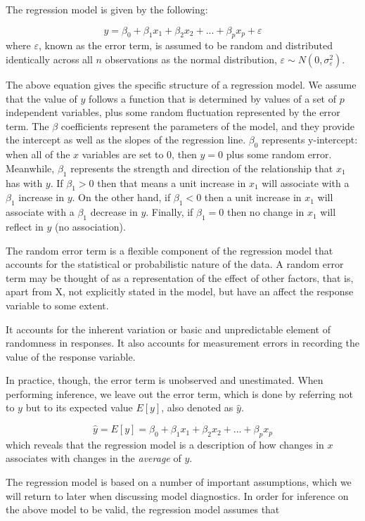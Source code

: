 \documentclass{article}
\begin{document}
The regression model is given by the following:

$$
y = \beta_0 + \beta_1 x_1 + \beta_2 x_2 + ... + \beta_p x_p + \varepsilon
$$
where $\varepsilon$, known as the error term, is assumed to be random and distributed identically across all $n$ observations as the normal distribution, $\varepsilon \sim N(0, \sigma^2_\varepsilon)$.

The above equation gives the specific structure of a regression model. We assume that the value of $y$ follows a function that is determined by values of a set of $p$ independent variables, plus some random fluctuation represented by the error term. The $\beta$ coefficients represent the parameters of the model, and they provide the intercept as well as the slopes of the regression line. $\beta_0$ represents y-intercept: when all of the $x$ variables are set to 0, then $y = 0$ plus some random error. Meanwhile, $\beta_1$ represents the strength and direction of the relationship that $x_1$ has with $y$. If $\beta_1 > 0$ then that means a unit increase in $x_1$ will associate with a $\beta_1$ increase in $y$. On the other hand, if $\beta_1 < 0$ then a unit increase in $x_1$ will associate with a $\beta_1$ decrease in $y$. Finally, if $\beta_1 = 0$ then no change in $x_1$ will reflect in $y$ (no association).

The random error term is a flexible component of the regression model that accounts for the statistical or probabilistic nature of the data. A random error term may be thought of as a representation of the effect of other factors, that is, apart from X, not explicitly stated in the model, but have an affect the response variable to some extent.

It accounts for the inherent variation or basic and unpredictable element of randomness in responses. It also accounts for measurement errors in recording the value of the response variable.

In practice, though, the error term is unobserved and unestimated. When performing inference, we leave out the error term, which is done by referring not to $y$ but to its expected value $E[y]$, also denoted as $\hat{y}$.

$$
\hat{y} = E[y] = \beta_0 + \beta_1 x_1 + \beta_2 x_2 + ... + \beta_p x_p
$$
which reveals that the regression model is a description of how changes in $x$ associates with changes in the \textit{average} of $y$.

The regression model is based on a number of important assumptions, which we will return to later when discussing model diagnostics. In order for inference on the above model to be valid, the regression model assumes that
\end{document}
